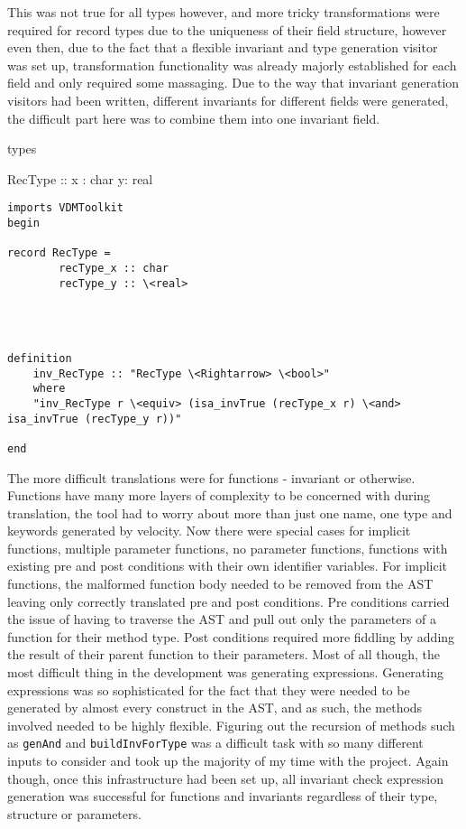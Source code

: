 This was not true for all types however, and more tricky transformations were required for record types due to the uniqueness of their field structure, however even then, due to the fact that a flexible invariant and type generation visitor was set up, transformation functionality was already majorly established for each field and only required some massaging. Due to the way that invariant generation visitors had been written, different invariants for different fields were generated, the difficult part here was to combine them into one invariant field.
\begin{vdmsl}[caption=Rec2FieldsDiffTypes.vdmsl\, two fields needed to have invariant checks in the invariant but were generated in separate invariant functions.]
types

RecType :: x : char
           y: real
\end{vdmsl}

\begin{lstlisting}[language=Isabelle, caption=After removing malformed individual invariants from the AST\, one was generated and combined\, no additional code had to be written to translate each field's type as this had already been done when translating type constructs.]
  imports VDMToolkit
begin

record RecType =
        recType_x :: char
        recType_y :: \<real>
    



definition
	inv_RecType :: "RecType \<Rightarrow> \<bool>"
    where
    "inv_RecType r \<equiv> (isa_invTrue (recType_x r) \<and> isa_invTrue (recType_y r))"

end
\end{lstlisting}

The more difficult translations were for functions - invariant or otherwise. Functions have many more layers of complexity to be concerned with during translation, the tool had to worry about more than just one name, one type and keywords generated by velocity. Now there were special cases for implicit functions, multiple parameter functions, no parameter functions, functions with existing pre and post conditions with their own identifier variables. For implicit functions, the malformed function body needed to be removed from the AST leaving only correctly translated pre and post conditions. Pre conditions carried the issue of having to traverse the AST and pull out only the parameters of a function for their method type. Post conditions required more fiddling by adding the result of their parent function to their parameters. Most of all though, the most difficult thing in the development was generating expressions. Generating expressions was so sophisticated for the fact that they were needed to be generated by almost every construct in the AST, and as such, the methods involved needed to be highly flexible. Figuring out the recursion of methods such as \lstinline[language=Isabelle]{genAnd} and \lstinline[language=Isabelle]{buildInvForType} was a difficult task with so many different inputs to consider and took up the majority of my time with the project. Again though, once this infrastructure had been set up, all invariant check expression generation was successful for functions and invariants regardless of their type, structure or parameters.

